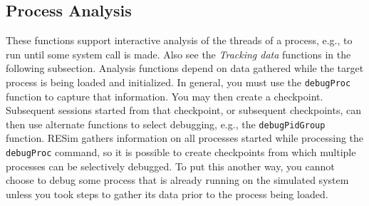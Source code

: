 \documentclass[titlepage]{article}
\begin{document}
\subsection{Process Analysis}
These functions support interactive analysis of the threads of a process, e.g., to run until some system call is made.  Also see the \textit{Tracking data} functions
in the following subsection.  Analysis functions depend on data gathered while the target process is being loaded and initialized.  In general, you
must use the {\tt debugProc} function to capture that information.  You may then create a checkpoint.  Subsequent sessions started from that checkpoint,
or subsequent checkpoints, can then use alternate functions to select debugging, e.g., the {\tt debugPidGroup} function. RESim gathers information on
all processes started while processing the {\tt debugProc} command, so it is possible to create checkpoints from which multiple processes can be selectively
debugged.  To put this another way, you cannot choose to debug some process that is already running on the simulated system unless you took steps to
gather its data prior to the process being loaded.
\end{document}
